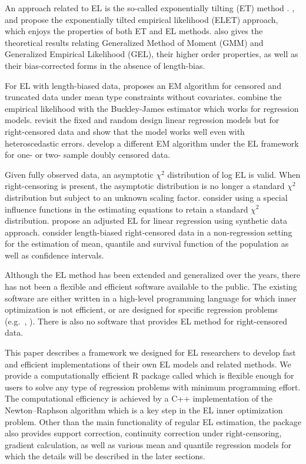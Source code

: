 \documentclass[article]{jss}
\renewcommand{\|}{\,|\,}
\begin{document}
An approach related to EL is the so-called exponentially tilting (ET) method \citep{efron1981}. \citet{schennach2005}, and \citet{schennach2007} propose the exponentially tilted empirical likelihood (ELET) approach, which enjoys the properties of both ET and EL methods. \citet{newey-smith2004} also gives the theoretical results relating Generalized Method of Moment (GMM) and Generalized Empirical Likelihood (GEL), their higher order properties, as well as their bias-corrected forms in the absence of length-bias.

For EL with length-biased data, \citet{zhou2005} proposes an EM algorithm for censored and truncated data under mean type constraints without covariates. \citet{zhou-li2008} combine the empirical likelihood with the Buckley-James estimator which works for regression models. \citet{zhou-et-al2012} revisit the fixed and random design linear regression models but for right-censored data and show that the model works well even with heteroscedastic errors. \citet{shen-et-al2016} develop a different EM algorithm under the EL framework for one- or two- sample doubly censored data.

Given fully observed data, an asymptotic \(\chi^2\) distribution of log EL is valid. When right-censoring is present, the asymptotic distribution is no longer a standard \(\chi^2\) distribution but subject to an unknown scaling factor. \citet{he-et-al2016} consider using a special influence functions in the estimating equations to retain a standard \(\chi^2\) distribution. \citet{li-wang2003} propose an adjusted EL for linear regression using synthetic data approach. \citet{ning-et-al2013} consider length-biased right-censored data in a non-regression setting for the estimation of mean, quantile and survival function of the population as well as confidence intervals.

Although the EL method has been extended and generalized over the years, there has not been a flexible and efficient software available to the public. The existing software are either written in a high-level programming language for which inner optimization is not efficient, or are designed for specific regression problems (e.g.~, ). There is also no software that provides EL method for right-censored data.

This paper describes a framework we designed for EL researchers to develop fast and efficient implementations of their own EL models and related methods. We provide a computationally efficient R package called  which is flexible enough for users to solve any type of regression problems with minimum programming effort. The computational efficiency is achieved by a C++ implementation of the Newton--Raphson algorithm which is a key step in the EL inner optimization problem. Other than the main functionality of regular EL estimation, the package also provides support correction, continuity correction under right-censoring, gradient calculation, as well as various mean and quantile regression models for which the details will be described in the later sections.
\end{document}
